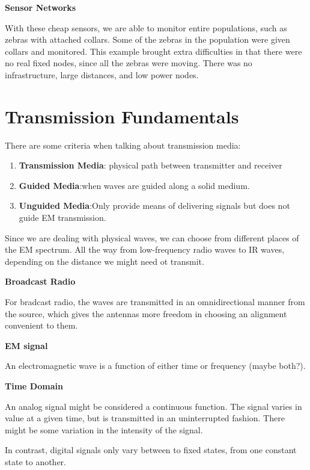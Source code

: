 \documentclass{article}
\begin{document}
\hspace {10mm}\textbf{Sensor Networks}

With these cheap sensors, we are able to monitor entire populations, such as zebras with attached collars. Some of the 
zebras in the population were given collars and monitored. This example brought extra difficulties in that there were 
no real fixed nodes, since all the zebras were moving. There was no infrastructure, large distances, and low power nodes.
\newpage
\section{Transmission Fundamentals}

There are some criteria when talking about transmission media:
\begin{enumerate}
	\item{\textbf{Transmission Media}}: physical path between transmitter and receiver

	\item{\textbf{Guided Media}}:when waves are guided along a solid medium.

	\item{\textbf{Unguided Media}}:Only provide means of delivering signals but does not guide EM transmission.
\end{enumerate}

Since we are dealing with physical waves, we can choose from different places of the EM spectrum. All the way from low-frequency
radio waves to IR waves, depending on the distance we might need ot transmit.

\hspace{10mm}\textbf{Broadcast Radio}

For bradcast radio, the waves are transmitted in an omnidirectional manner from the source, which gives the antennas more 
freedom in choosing an alignment convenient to them.

\hspace{10mm}\textbf{EM signal}

An electromagnetic wave is a function of either time or frequency (maybe both?).

\hspace{10mm}\textbf{Time Domain}

An analog signal might be considered a continuous function. The signal varies in value at a given time, but is transmitted in
an uninterrupted fashion. There might be some variation in the intensity of the signal.

In contrast, digital signals only vary between to fixed states, from one constant state to another.
\end{document}
